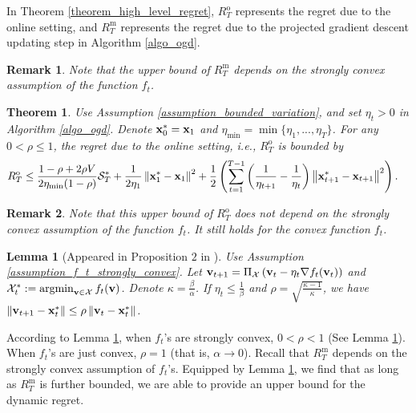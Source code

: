 \documentclass{article}
\newtheorem{Theorem}{\bf{Theorem}}
\newtheorem{Lemma}{\bf{Lemma}}
\newtheorem{Remark}{\bf{Remark}}
\begin{document}
In Theorem \ref{theorem_high_level_regret}, $R^{\mathrm{o}}_T$ represents the regret due to the online setting, and $R^{\mathrm{m}}_T$ represents the regret due to the projected gradient descent updating step in Algorithm \ref{algo_ogd}. 
\begin{Remark}
Note that the upper bound of $R^{\mathrm{m}}_T$ depends on the strongly convex assumption of the function $f_t$.  
\end{Remark}

\begin{Theorem}
\label{theorem_recurrsive_bound}
Use Assumption \ref{assumption_bounded_variation}, and set  $\eta_t>0$ in Algorithm \ref{algo_ogd}. Denote ${\bf x}_0^{\ast} = {\bf x}_1$ and $\eta_{\min} = \min\{\eta_1, ..., \eta_T\}$. For any  $0 < \rho \le 1$, the regret due to the online setting, i.e., $R^{\mathrm{o}}_T$ is bounded by 
\begin{align}
\nonumber
& R^{\mathrm{o}}_T   \le   \frac{1-\rho + 2\rho V}{2\eta_{\min}(1-\rho)} {\mathcal{S}}_T^{\ast} + \frac{1}{2\eta_1}\left\lVert{\bf x}_1^{\ast} - {\bf x}_1\right\rVert^2  + \frac{1}{2}\left( \sum\limits_{t=1}^{T-1} \left( \frac{1}{\eta_{t+1}} - \frac{1}{\eta_t} \right) \left\lVert {\bf x}_{t+1}^{\ast} - {\bf x}_{t+1} \right\rVert^2     \right).
\end{align} 
\end{Theorem} 

\begin{Remark}
Note that this upper bound of $R^{\mathrm{o}}_T$ does not depend on the strongly convex assumption of the function $f_t$. It still holds for the convex function $f_t$. 
\end{Remark}

\begin{Lemma}[Appeared in Proposition $2$ in \cite{Mokhtari:2016jz}]
\label{lemma_linear_x}
Use Assumption \ref{assumption_f_t_strongly_convex}. Let ${\bf v}_{t+1} = \Pi_{{\mathcal{X}}} \left( {\bf v}_t - \eta_t \nabla f_t({\bf v}_t) \right)$ and $\Xcal_t^{\ast} := \argmin_{\v\in\Xcal} f_t(\v)$. Denote $\kappa = \frac{\beta}{\alpha}$. If $\eta_t \le \frac{1}{\beta}$ and $\rho = \sqrt{\frac{\kappa - 1}{\kappa}}$, we have $\left\lVert{\bf v}_{t+1} - {\bf x}_t^{\ast} \right\rVert    \le  \rho    \left\lVert{\bf v}_t - {\bf x}_t^{\ast} \right\rVert$.
\end{Lemma} According to Lemma \ref{lemma_linear_x}, when $f_t$'s are strongly convex, $0< \rho< 1 $ (See  Lemma \ref{lemma_linear_x}). When $f_t$'s are just convex, $\rho = 1$ (that is, $\alpha \rightarrow 0$). Recall that $R^{\mathrm{m}}_T$ depends on the strongly convex assumption of $f_t$'s. Equipped by Lemma \ref{lemma_linear_x},  we find that as long as $R^{\mathrm{m}}_T$ is further bounded, we are able to provide an upper bound for the dynamic regret.
\end{document}
